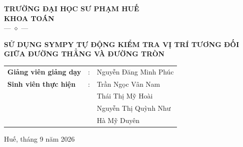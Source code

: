\documentclass[12pt,a4paper]{article}
\begin{document}

\begin{titlepage}

    \centering
    \vspace*{0.2cm}
    {\large \textbf{TRƯỜNG ĐẠI HỌC SƯ PHẠM HUẾ}}\\
     {\large \textbf{KHOA TOÁN}}\\
    \vspace{0.2cm}
    --- $\diamond$ ---



    \vspace{7cm}

      {\LARGE \textbf{
    SỬ DỤNG SYMPY  TỰ ĐỘNG KIỂM TRA VỊ TRÍ TƯƠNG ĐỐI GIỮA ĐƯỜNG THẲNG VÀ ĐƯỜNG TRÒN}}
 

    \vspace{2.5cm}
    \large
    \renewcommand{\arraystretch}{1.3}
    \begin{tabular}{lcl}
    \textbf{Giảng viên giảng dạy} & : &Nguyễn Đăng Minh Phúc\\
\textbf{Sinh viên thực hiện} & : & Trần Ngọc Vân Nam \\
                         &   & Thái Thị Mỹ Hoài \\
                         &   & Nguyễn Thị Quỳnh Như \\
                         &   & Hà Mỹ Duyên \\

    \end{tabular}

    \vfill
    {\large Huế, tháng 9 năm 2026}
    \vspace*{0.2cm}
\end{titlepage}

\end{document}
